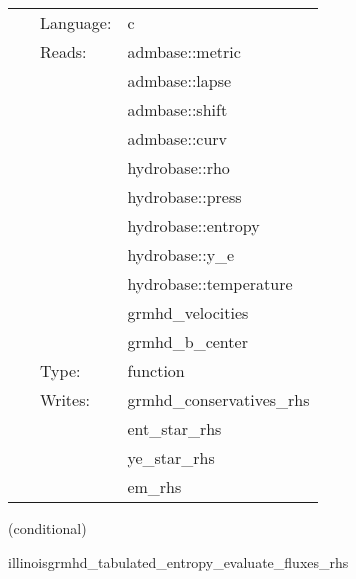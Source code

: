 \documentclass{article}
\begin{document}
\hspace{5mm}{\it entropy+tabulated version of illinoisgrmhd\_evaluate\_sources\_rhs } 


\hspace{5mm}

 \begin{tabular*}{160mm}{cll} 
~ & Language:  & c \\ 
~ & Reads:  & admbase::metric \\ 
~& ~ &admbase::lapse\\ 
~& ~ &admbase::shift\\ 
~& ~ &admbase::curv\\ 
~& ~ &hydrobase::rho\\ 
~& ~ &hydrobase::press\\ 
~& ~ &hydrobase::entropy\\ 
~& ~ &hydrobase::y\_e\\ 
~& ~ &hydrobase::temperature\\ 
~& ~ &grmhd\_velocities\\ 
~& ~ &grmhd\_b\_center\\ 
~ & Type:  & function \\ 
~ & Writes:  & grmhd\_conservatives\_rhs \\ 
~& ~ &ent\_star\_rhs\\ 
~& ~ &ye\_star\_rhs\\ 
~& ~ &em\_rhs\\ 
\end{tabular*} 


\vspace{5mm}

   (conditional) 

\hspace{5mm} illinoisgrmhd\_tabulated\_entropy\_evaluate\_fluxes\_rhs 

\hspace{5mm}{\it entropy+tabulated version of illinoisgrmhd\_evaluate\_fluxes\_rhs } 


\hspace{5mm}
\end{document}
